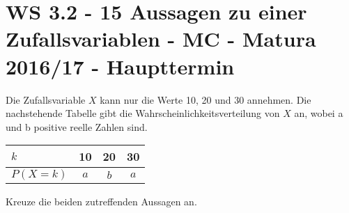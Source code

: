 \section{WS 3.2 - 15 Aussagen zu einer Zufallsvariablen - MC - Matura 2016/17 - Haupttermin}

\begin{beispiel}[WS 3.2]{1} %
Die Zufallsvariable $X$ kann nur die Werte 10, 20 und 30 annehmen. Die nachstehende Tabelle gibt
die Wahrscheinlichkeitsverteilung von $X$ an, wobei a und b positive reelle Zahlen sind. \leer

\begin{center}
\begin{tabular}{|l|c|c|c|} \hline
\cellcolor{black!20} $k$ & 10 & 20 & 30 \\ \hline
\cellcolor{black!20} $P(X=k)$ & $a$ & $b$ & $a$ \\ \hline
\end{tabular}
\end{center}

Kreuze die beiden zutreffenden Aussagen an. \leer

\end{beispiel}